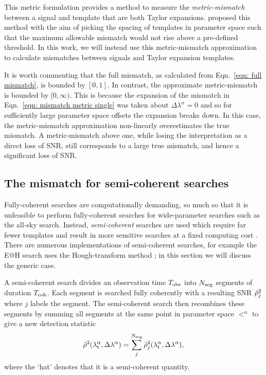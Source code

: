 \documentclass[../full_thesis/full_thesis.tex]{subfiles}
\begin{document}
This metric formulation provides a method to measure the \emph{metric-mismatch} between a
signal and template that are both Taylor expansions. \citet{Brady1998} proposed
this method with the aim of picking the spacing of templates in parameter space
such that the maximum allowable mismatch would not rise above a pre-defined
threshold. In this work, we will instead use this metric-mismatch approximation to
calculate mismatches between signals and Taylor expansion templates.

It is worth commenting that the full mismatch, as calculated from
Eqn.~\eqref{eqn: full mismatch}, is bounded by $[0, 1]$. In contrast, the
approximate metric-mismatch is bounded by $[0, \infty)$. This is because the
expansion of the mismatch in Eqn.~\eqref{eqn: mismatch metric single} was
taken about $\Delta\lambda^{\alpha}=0$ and so for sufficiently large parameter
space offsets the expansion breaks down. In this case, the metric-mismatch
approximation non-linearly overestimates the true mismatch. A metric-mismatch
above one, while losing the interpretation as a direct loss of SNR, still
corresponds to a large true mismatch, and hence a significant loss of SNR.


\subsection{The mismatch for semi-coherent searches}
\label{sec: semi-coherent mismatch}

Fully-coherent searches are computationally demanding, so much so that it is
unfeasible to perform fully-coherent searches for wide-parameter searches
such as the all-sky search. Instead, \emph{semi-coherent}
searches are used which require far fewer templates and result in more
sensitive searches at a fixed computing cost \citep{Prix2009}. There are numerous
implementations of semi-coherent searches, for example the E@H search uses
the Hough-transform method \citep{Krishnan2004}; in this section we will discuss
the generic case.

A semi-coherent search divides an observation time $T_{\mathrm{obs}}$ into $N_{\textrm{seg}}$ segments of
duration $T_{\mathrm{coh}}$. Each segment is searched fully coherently with a resulting
SNR $\tilde{\rho}^{2}_{j}$ where $j$ labels the
segment. The semi-coherent search then recombines these segments by summing
all segments at the same point in parameter space $\lt^{\alpha}$ to give a new
detection statistic
\begin{align}
\hat{\rho}^{2}({\lambda}_\textrm{t}^{\alpha}, \Delta\lambda^{\alpha}) =
 \sum_{j}^{N_{\textrm{seg}}}\tilde{\rho}^{2}_{j}({\lambda}_\textrm{t}^{\alpha}, \Delta\lambda^{\alpha}),
\label{eqn: semi-coherent sum}
\end{align}
where the `hat' denotes that it is a semi-coherent quantity.
\end{document}
